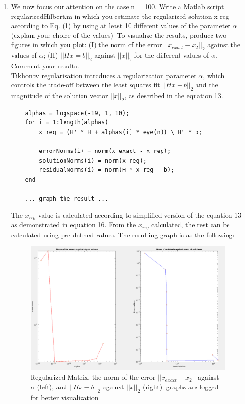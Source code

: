 \documentclass[unicode,11pt,a4paper,oneside,numbers=endperiod,openany]{scrartcl}
\newcommand{\norm}[1]{\lvert\lvert #1 \rvert\rvert}
\begin{document}
\begin{enumerate}[label=(\alph*)]
\item We now focus our attention on the case n = 100. Write a Matlab script regularizedHilbert.m in
which you estimate the regularized solution x reg according to Eq. (1) by using at least 10 different values of the
parameter ${\alpha}$ (explain your choice of the values). To visualize the results, produce two figures in which you plot:
(I) the norm of the error ${\norm{x_{exact} - x_{2}}_2}$ against the values of ${\alpha}$; (II) 
${\norm{Hx = b}_2}$ against ${\norm{x}_2}$ for the different
values of ${\alpha}$. Comment your results. \\

Tikhonov regularization introduces a regularization parameter ${\alpha}$, which controls the trade-off between the least squares fit ${\norm{Hx - b}_2}$ and the magnitude of the solution vector ${\norm{x}_2}$, as described in the equation 13. \\

\begin{lstlisting}
    alphas = logspace(-19, 1, 10);
    for i = 1:length(alphas)
        x_reg = (H' * H + alphas(i) * eye(n)) \ H' * b;

        errorNorms(i) = norm(x_exact - x_reg);
        solutionNorms(i) = norm(x_reg);
        residualNorms(i) = norm(H * x_reg - b);
    end
        
    ... graph the result ...
\end{lstlisting}

\vspace{20px}

The ${x_{reg}}$ value is calculated according to simplified version of the equation 13 as demonstrated in equation 16. From the ${x_{reg}}$ calculated, the rest can be calculated using pre-defined values. The resulting graph is as the following:

\vspace{20px}

 \begin{figure}[h!]
    \begin{minipage}[c]{1\linewidth}
        \centering
        \includegraphics[width=0.9\linewidth]{./figures/ex5c.png}
    \end{minipage}
  \caption{Regularized Matrix, the norm of the error ${\norm{x_{exact} - x_2}}$ against ${\alpha}$ (left), and ${\norm{Hx - b}_2}$ against ${\norm{x}_2}$ (right), graphs are logged for better visualization}
\end{figure}


\end{enumerate}
\end{document}
